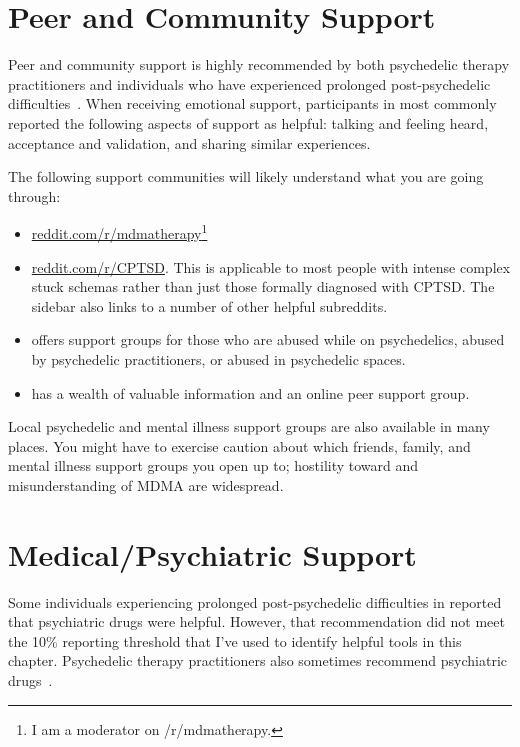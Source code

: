 \documentclass[11pt,oneside]{book}
\let\cite\parencite
\begin{document}
\section{Peer and Community Support}
Peer and community support is highly recommended by both psychedelic therapy practitioners and individuals who have experienced prolonged post-psychedelic difficulties~\cite{argyri2025practitioner,robinson2024coming}. When receiving emotional support, participants in \textcite{robinson2024coming} most commonly reported the following aspects of support as helpful: talking and feeling heard, acceptance and validation, and sharing similar experiences.

The following support communities will likely understand what you are going through:
\begin{itemize}
    \item \href{https://www.reddit.com/r/mdmatherapy/}{reddit.com/r/mdmatherapy}\footnote{I am a moderator on /r/mdmatherapy.}
    \item \href{https://www.reddit.com/r/CPTSD/}{reddit.com/r/CPTSD}. This is applicable to most people with intense complex stuck schemas rather than just those formally diagnosed with CPTSD. The sidebar also links to a number of other helpful subreddits.
    \item \textcite{shineCollective} offers support groups for those who are abused while on psychedelics, abused by psychedelic practitioners, or abused in psychedelic spaces.
    \item \textcite{peersupportgroup} has a wealth of valuable information and an online peer support group.
\end{itemize}

Local psychedelic and mental illness support groups are also available in many places. You might have to exercise caution about which friends, family, and mental illness support groups you open up to; hostility toward and misunderstanding of MDMA are widespread.

\section{Medical/Psychiatric Support}
Some individuals experiencing prolonged post-psychedelic difficulties in \textcite{robinson2024coming} reported that psychiatric drugs were helpful. However, that recommendation did not meet the 10\% reporting threshold that I've used to identify helpful tools in this chapter. Psychedelic therapy practitioners also sometimes recommend psychiatric drugs~\cite{argyri2025practitioner}.
\end{document}
